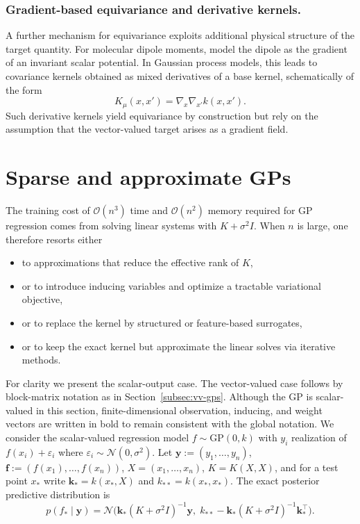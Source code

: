 \documentclass[11pt,a4paper]{article}
\newcommand{\by}{\boldsymbol{y}}
\begin{document}
\subsubsection{Gradient-based equivariance and derivative kernels.}
A further mechanism for equivariance exploits additional physical structure of the target quantity.
For molecular dipole moments, \cite{Sun_2022} model the dipole as the gradient of an invariant scalar potential.
In Gaussian process models, this leads to covariance kernels obtained as mixed derivatives of a base kernel,
schematically of the form
\begin{displaymath}K_{\mu}(x,x') = \nabla_x \nabla_{x'} k(x,x').\end{displaymath}
Such derivative kernels yield equivariance by construction but rely on the assumption that the vector-valued target arises as a gradient field.

\section{Sparse and approximate GPs}
\label{sec:sparse-gps}

The training cost of $\mathcal{O}(n^3)$ time and $\mathcal{O}(n^2)$ memory required for GP regression comes from solving linear systems with $K+\sigma^2 I.$ When $n$ is large, one therefore resorts either 
\begin{itemize}
\item to approximations that reduce the effective rank of $K$, 
\item or to introduce inducing variables and optimize a tractable variational objective, 
\item or to replace the kernel by structured or feature-based surrogates, 
\item or to keep the exact kernel but approximate the linear solves via iterative methods. 
\end{itemize}

For clarity we present the scalar-output case. The vector-valued case follows by block-matrix notation as in Section~\ref{subsec:vv-gps}. Although the  GP is scalar-valued in this section, finite-dimensional observation, inducing, and weight vectors are written in bold to remain consistent with the global notation. We consider the scalar-valued regression model $f\sim\mathrm{GP}(0,k)$ with $y_i$ realization of $f(x_i)+\varepsilon_i$ where $\varepsilon_i\sim\mathcal{N}(0,\sigma^2)$. Let $\by:=(y_1,\dots,y_n)$, $\boldsymbol{f}:=(f(x_1),\dots,f(x_n))$, $X=\left(x_1,\ldots,x_n\right)$, $K=K(X,X)$, and for a test point $x_\ast$ write $\boldsymbol{k}_\ast=k(x_\ast,X)$ and $k_{\ast\ast}=k(x_\ast,x_\ast)$.
The exact posterior predictive distribution is
\begin{displaymath}p(f_\ast\mid \by)=\mathcal{N}\!\big(\boldsymbol{k}_\ast(K+\sigma^2I)^{-1}\by,\;k_{\ast\ast}-\boldsymbol{k}_\ast(K+\sigma^2I)^{-1}\boldsymbol{k}_\ast^\top\big).\end{displaymath}
\end{document}
